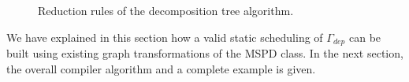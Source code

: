 \begin{figure}[h!]
\begin{center}
{
}
\caption{Reduction rules of the decomposition tree algorithm.}
\label{fig:rules}
\end{center}
\end{figure}

We have explained in this section how a valid static scheduling of $\Gamma_{dep}$ can be built using existing graph transformations of the MSPD class. In the next section, the overall compiler algorithm and a complete example is given.





